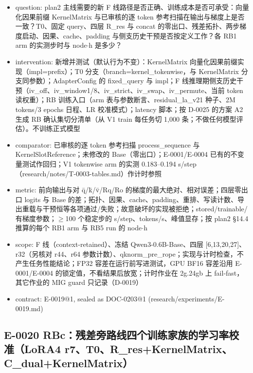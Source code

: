 \documentclass[11pt]{article}
\begin{document}
\begin{itemize}
\item question: plan2 主线需要的新 F 线路径是否正确、训练成本是否可承受：向量化因果前缀 KernelMatrix 与已审核的逐 token 参考扫描在输出与梯度上是否一致？T0、固定 query、四层 R\_res 与 concat 的零出口、残差拓扑、两步梯度启动、因果、cache、padding 与侧支历史干预是否按定义工作？各 RB1 arm 的实测步时与 node\ensuremath{\cdot}h 是多少？
\item intervention: 新增并测试（默认行为不变）：KernelMatrix 向量化因果前缀实现（impl=prefix）；T0 分支（branch=kernel\_tokenwise，与 KernelMatrix 分支同参数）；AdapterConfig 的 fixed\_query 与 impl；F 线推理期侧支历史干预（iv\_off、iv\_window1/8、iv\_strict、iv\_swap、iv\_permute、当前 token 读权重）；RB 训练入口（arm 表与参数断言、residual\_la\_v21 种子、2M tokens/3 epochs 日程、LR 校准模式）；latency 脚本；按 D-0025 的方案 A2 生成 RB 确认集切分清单（从 V1 train 每任务切 1,000 条；不做任何模型评估）。不训练正式模型
\item comparator: 已审核的逐 token 参考扫描 process\_sequence 与 KernelSlotReference；未修改的 Base（零出口）；E-0001/E-0004 已有的不变量测试作回归；V1 tokenwise arm 的实测 0.183--0.194 s/step（research/notes/T-0003-tables.md）作计时参照
\item metric: 前向输出与对 q̄/k̄/v̄/Rq/Ro 的梯度的最大绝对、相对误差；四层零出口 logits 与 Base 的差；拓扑、因果、cache、padding、重排、写读计数、导出重载与干预恒等各项通过/失败；故意破坏的实现被拒绝；stored/trainable/有梯度参数；\ensuremath{\geq}100 个稳定步的 s/step、tokens/s、峰值显存；按 plan2 §14.4 推算的每个 RB1 arm 与 RB5 run 的 node\ensuremath{\cdot}h
\item scope: F 线（context-retained）、冻结 Qwen3-0.6B-Base、四层 [6,13,20,27]、r32（另核对 r44、r64 参数计数）、qknorm\_pre\_rope；实现与计时检查，不产生任务性能结论；FP32 容差在运行前写进测试，GPU BF16 容差沿用 E-0001/E-0004 的锁定值，不看结果后放宽；计时作业在 2g.24gb 上 fail-fast，其它作业的 MIG guard 只记录（D-0019）
\item contract: E-0019@1, sealed as DOC-0203@1 (research/experiments/E-0019.md)
\end{itemize}

\subsection*{E-0020 RBc：残差旁路线四个训练家族的学习率校准（LoRA4 r7、T0、R\_res+KernelMatrix、C\_dual+KernelMatrix）}
\end{document}
